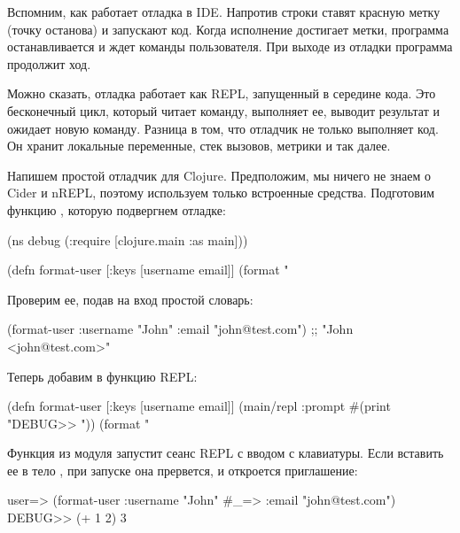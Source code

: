 Вспомним, как работает отладка в IDE. Напротив строки ставят красную метку (точку останова) и запускают код. Когда исполнение достигает метки, программа останавливается и ждет команды пользователя. При выходе из отладки программа продолжит ход.

Можно сказать, отладка работает как REPL, запущенный в середине кода. Это бесконечный цикл, который читает команду, выполняет ее, выводит результат и ожидает новую команду. Разница в том, что отладчик не только выполняет код. Он хранит локальные переменные, стек вызовов, метрики и так далее.

Напишем простой отладчик для Clojure. Предположим, мы ничего не знаем о Cider и nREPL, поэтому используем только встроенные средства. Подготовим функцию , которую подвергнем отладке:

\begin{english}
  \begin{clojure}
(ns debug
  (:require [clojure.main :as main]))

(defn format-user
  [{:keys [username email]}]
  (format "%
  \end{clojure}
\end{english}

Проверим ее, подав на вход простой словарь:

\begin{english}
  \begin{clojure}
(format-user {:username "John"
              :email "john@test.com"})
;; "John <john@test.com>"
  \end{clojure}
\end{english}

Теперь добавим в функцию REPL:

\begin{english}
  \begin{clojure}
(defn format-user
  [{:keys [username email]}]
  (main/repl :prompt #(print "DEBUG>> "))
  (format "%
  \end{clojure}
\end{english}

Функция  из модуля  запустит сеанс REPL с вводом с клавиатуры. Если вставить ее в тело , при запуске она прервется, и откроется приглашение:

\begin{english}
  \begin{text}
user=> (format-user {:username "John"
  #_=>               :email "john@test.com"})
DEBUG>> (+ 1 2)
3
  \end{text}
\end{english}

